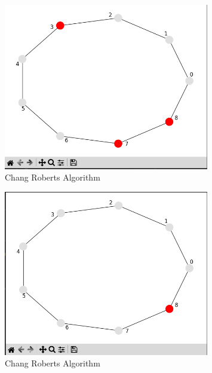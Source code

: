 \documentclass[11pt]{beamer}              %
\begin{document}
\begin{frame}
\begin{figure}
    \centering
    \includegraphics[width=0.8\textwidth]{figures/algo2cr.png}
    \caption{Chang Roberts Algorithm}
\end{figure}
\end{frame}

\begin{frame}
\begin{figure}
    \centering
    \includegraphics[width=0.8\textwidth]{figures/algo3cr.png}
    \caption{Chang Roberts Algorithm}
\end{figure}
\end{frame}
\end{document}
